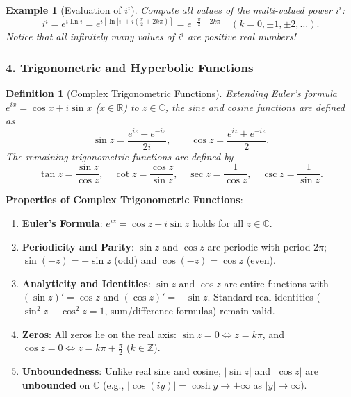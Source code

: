 \documentclass[11pt,a4paper]{article}
\theoremstyle{definitionbreak}
\newtheorem{definition}{Definition}
\theoremstyle{examplebreak}
\newtheorem{example}{Example}
\theoremstyle{plain}
\begin{document}
\begin{example}[Evaluation of $i^i$]
Compute all values of the multi-valued power $i^i$:
\[
    i^i = e^{i \operatorname{Ln} i} = e^{i\left[\ln|i| + i\left(\frac{\pi}{2} + 2k\pi\right)\right]} = e^{-\frac{\pi}{2} - 2k\pi} \quad (k = 0, \pm 1, \pm 2, \dots).
\]
Notice that all infinitely many values of $i^i$ are positive real numbers!
\end{example}

\subsubsection{4. Trigonometric and Hyperbolic Functions}

\begin{definition}[Complex Trigonometric Functions]
Extending Euler's formula $e^{ix} = \cos x + i\sin x$ ($x \in \mathbb{R}$) to $z \in \mathbb{C}$, the sine and cosine functions are defined as
\[
    \sin z = \frac{e^{iz} - e^{-iz}}{2i}, \qquad \cos z = \frac{e^{iz} + e^{-iz}}{2}.
\]
The remaining trigonometric functions are defined by
\[
    \tan z = \frac{\sin z}{\cos z}, \quad \cot z = \frac{\cos z}{\sin z}, \quad \sec z = \frac{1}{\cos z}, \quad \csc z = \frac{1}{\sin z}.
\]
\end{definition}

\textbf{Properties of Complex Trigonometric Functions}:
\begin{enumerate}
    \item \textbf{Euler's Formula}: $e^{iz} = \cos z + i\sin z$ holds for all $z \in \mathbb{C}$.
    \item \textbf{Periodicity and Parity}: $\sin z$ and $\cos z$ are periodic with period $2\pi$; $\sin(-z) = -\sin z$ (odd) and $\cos(-z) = \cos z$ (even).
    \item \textbf{Analyticity and Identities}: $\sin z$ and $\cos z$ are entire functions with $(\sin z)' = \cos z$ and $(\cos z)' = -\sin z$. Standard real identities ($\sin^2 z + \cos^2 z = 1$, sum/difference formulas) remain valid.
    \item \textbf{Zeros}: All zeros lie on the real axis: $\sin z = 0 \iff z = k\pi$, and $\cos z = 0 \iff z = k\pi + \frac{\pi}{2}$ ($k \in \mathbb{Z}$).
    \item \textbf{Unboundedness}: Unlike real sine and cosine, $|\sin z|$ and $|\cos z|$ are \textbf{unbounded} on $\mathbb{C}$ (e.g., $|\cos(iy)| = \cosh y \to +\infty$ as $|y| \to \infty$).
\end{enumerate}
\end{document}
